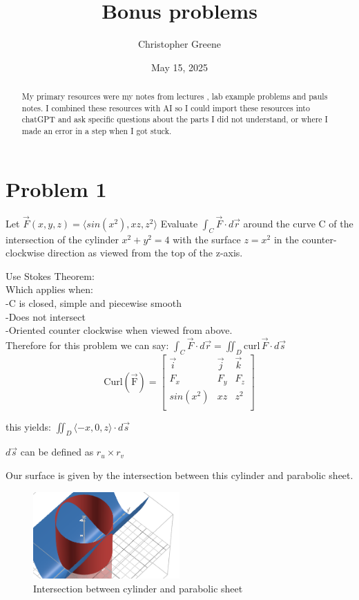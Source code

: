 \documentclass[12pt]{amsart}
\title{Bonus problems}
\author{Christopher Greene}
\date{May 15, 2025}
\newcommand{\lineint}[1]{\int_C \vec{#1} \cdot d\vec{r}}
\newcommand{\surfint}[1]{\iint_D {#1} \cdot d\vec{s}}
\newcommand{\vectr}[3]{\langle {#1} , {#2} , {#3} \rangle}
\begin{document}
\maketitle

\begin{abstract}
    My primary resources were my notes from lectures , lab example problems and pauls notes. I combined these resources with AI so I could import these 
    resources into chatGPT and ask specific questions about the parts I did not understand, or where I made an error in a step when I got stuck.
\end{abstract}

\section{Problem 1}

Let $ \vec{F}(x,y,z) = \langle sin(x^2) , xz , z^2 \rangle $
Evaluate $\lineint{F}$ around the curve C of the intersection of the cylinder $ x^2 + y^2 = 4$ with 
the surface $z = x^2$ in the counter-clockwise direction as viewed from the top of the z-axis.

Use Stokes Theorem: \\
Which applies when: \\
-C is closed, simple and piecewise smooth \\
-Does not intersect \\
-Oriented counter clockwise when viewed from above. \\

Therefore for this problem we can say:
$\lineint{F} = \surfint{\mathrm{curl}\,\vec{F}}$ 
\[
\mathrm{Curl(\vec{F})} = \begin{bmatrix}
    \vec{i} & \vec{j} & \vec{k} \\
    F_x     &  F_y    &  F_z    \\
    sin(x^2)&  xz     &  z^2    \\
\end{bmatrix}
\]

this yields:
$\surfint{\vectr{-x}{0}{z}}$

$d\vec{s}$ can be defined as $r_u \times r_v$ 

Our surface is given by the intersection between this cylinder and parabolic sheet.

\begin{figure}[H]
\includegraphics[width=0.5\textwidth]{Figure1.png}  
\caption{Intersection between cylinder and parabolic sheet}
\label{figure1}  
\end{figure}
\end{document}
